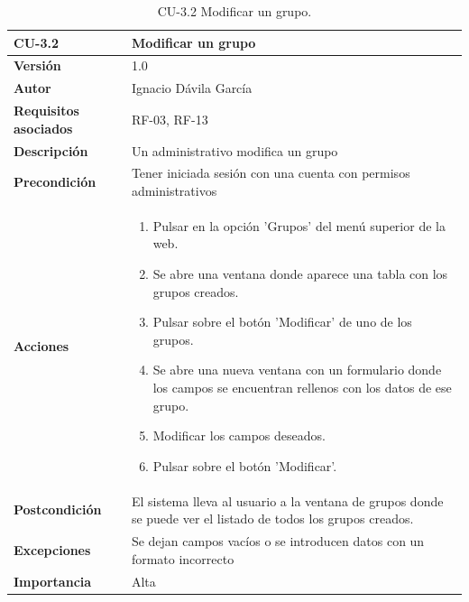 \begin{table}[p]
	\centering
	\begin{tabularx}{\linewidth}{ p{} p{} }
		\toprule
		\textbf{CU-3.2}    & \textbf{Modificar un grupo}\\
		\toprule
		\textbf{Versión}              & 1.0    \\
		\textbf{Autor}                & Ignacio Dávila García \\
		\textbf{Requisitos asociados} & RF-03, RF-13 \\
		\textbf{Descripción}          & Un administrativo modifica un grupo \\
		\textbf{Precondición}         & Tener iniciada sesión con una cuenta con permisos administrativos \\
		\textbf{Acciones}             &
		\begin{enumerate}
			\def\labelenumi{\arabic{enumi}.}
			\tightlist
			\item Pulsar en la opción 'Grupos' del menú superior de la web.
			\item Se abre una ventana donde aparece una tabla con los grupos creados.
			\item Pulsar sobre el botón 'Modificar' de uno de los grupos.
			\item Se abre una nueva ventana con un formulario donde los campos se encuentran rellenos con los datos de ese grupo.
			\item Modificar los campos deseados.
			\item Pulsar sobre el botón 'Modificar'.
		\end{enumerate}\\
		\textbf{Postcondición}        & El sistema lleva al usuario a la ventana de grupos donde se puede ver el listado de todos los grupos creados. \\
		\textbf{Excepciones}          & Se dejan campos vacíos o se introducen datos con un formato incorrecto \\
		\textbf{Importancia}          & Alta \\
		\bottomrule
	\end{tabularx}
	\caption{CU-3.2 Modificar un grupo.}
\end{table}

